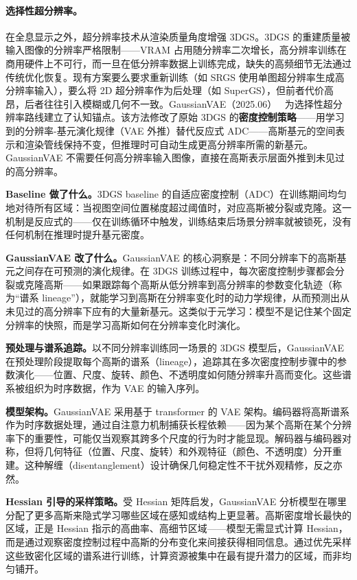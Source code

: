 \paragraph{选择性超分辨率。}

在全息显示之外，超分辨率技术从渲染质量角度增强 3DGS。3DGS 的重建质量被输入图像的分辨率严格限制——VRAM 占用随分辨率二次增长，高分辨率训练在商用硬件上不可行，而一旦在低分辨率数据上训练完成，缺失的高频细节无法通过传统优化恢复。现有方案要么要求重新训练（如 SRGS 使用单图超分辨率生成高分辨率输入），要么将 2D 超分辨率作为后处理（如 SuperGS），但前者代价高昂，后者往往引入模糊或几何不一致。GaussianVAE（2025.06）~\cite{2506_07897} 为选择性超分辨率路线建立了认知锚点。该方法修改了原始 3DGS 的\textbf{密度控制策略}——用学习到的分辨率-基元演化规律（VAE 外推）替代反应式 ADC——高斯基元的空间表示和渲染管线保持不变，但推理时可自动生成更高分辨率所需的新基元。GaussianVAE 不需要任何高分辨率输入图像，直接在高斯表示层面外推到未见过的高分辨率。

\textbf{Baseline 做了什么。}3DGS baseline 的自适应密度控制（ADC）在训练期间均匀地对待所有区域：当视图空间位置梯度超过阈值时，对应高斯被分裂或克隆。这一机制是反应式的——仅在训练循环中触发，训练结束后场景分辨率就被锁死，没有任何机制在推理时提升基元密度。

\textbf{GaussianVAE 改了什么。}GaussianVAE 的核心洞察是：不同分辨率下的高斯基元之间存在可预测的演化规律。在 3DGS 训练过程中，每次密度控制步骤都会分裂或克隆高斯——如果跟踪每个高斯从低分辨率到高分辨率的参数变化轨迹（称为“谱系 lineage”），就能学习到高斯在分辨率变化时的动力学规律，从而预测出从未见过的高分辨率下应有的大量新基元。这类似于元学习：模型不是记住某个固定分辨率的快照，而是学习高斯如何在分辨率变化时演化。

\textbf{预处理与谱系追踪。}以不同分辨率训练同一场景的 3DGS 模型后，GaussianVAE 在预处理阶段提取每个高斯的谱系（lineage），追踪其在多次密度控制步骤中的参数演化——位置、尺度、旋转、颜色、不透明度如何随分辨率升高而变化。这些谱系被组织为时序数据，作为 VAE 的输入序列。

\textbf{模型架构。}GaussianVAE 采用基于 transformer 的 VAE 架构。编码器将高斯谱系作为时序数据处理，通过自注意力机制捕获长程依赖——因为某个高斯在某个分辨率下的重要性，可能仅当观察其跨多个尺度的行为时才能显现。解码器与编码器对称，但将几何特征（位置、尺度、旋转）和外观特征（颜色、不透明度）分开重建。这种解缠（disentanglement）设计确保几何稳定性不干扰外观精修，反之亦然。

\textbf{Hessian 引导的采样策略。}受 Hessian 矩阵启发，GaussianVAE 分析模型在哪里分配了更多高斯来隐式学习哪些区域在感知或结构上更显著。高斯密度增长最快的区域，正是 Hessian 指示的高曲率、高细节区域——模型无需显式计算 Hessian，而是通过观察密度控制过程中高斯的分布变化来间接获得相同信息。通过优先采样这些致密化区域的谱系进行训练，计算资源被集中在最有提升潜力的区域，而非均匀铺开。

